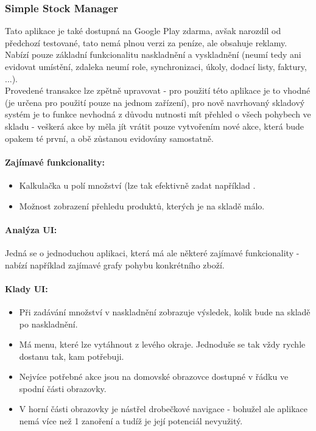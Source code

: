 
\subsubsection{Simple Stock Manager}

Tato aplikace je také dostupná na Google Play zdarma, avšak narozdíl od předchozí testované, tato nemá plnou verzi za peníze, ale obsahuje reklamy.\\
Nabízí pouze základní funkcionalitu naskladnění a vyskladnění (neumí tedy ani evidovat umístění, zdaleka neumí role, synchronizaci, úkoly, dodací listy, faktury, ...).\\
Provedené transakce lze zpětně upravovat - pro použití této aplikace je to vhodné (je určena pro použití pouze na jednom zařízení), pro nově navrhovaný skladový systém je to funkce nevhodná z důvodu nutnosti mít přehled o všech pohybech ve skladu - veškerá akce by měla jít vrátit pouze vytvořením nové akce, která bude opakem té první, a obě zůstanou evidovány samostatně.

\paragraph{Zajímavé funkcionality:}
\begin{itemize}
	\item Kalkulačka u polí množství (lze tak efektivně zadat například .
	\item Možnost zobrazení přehledu produktů, kterých je na skladě málo.
\end{itemize}

\paragraph{Analýza UI:} Jedná se o jednoduchou aplikaci, která má ale některé zajímavé funkcionality - nabízí například zajímavé grafy pohybu konkrétního zboží.

\paragraph{Klady UI:}
\begin{itemize}
	\item Při zadávání množství v naskladnění zobrazuje výsledek, kolik bude na skladě po naskladnění.
	\item Má menu, které lze vytáhnout z levého okraje. Jednoduše se tak vždy rychle dostanu tak, kam potřebuji.
	\item Nejvíce potřebné akce jsou na domovské obrazovce dostupné v řádku ve spodní části obrazovky.
	\item V horní části obrazovky je nástřel drobečkové navigace - bohužel ale aplikace nemá více než 1 zanoření a tudíž je její potenciál nevyužitý.
\end{itemize}

